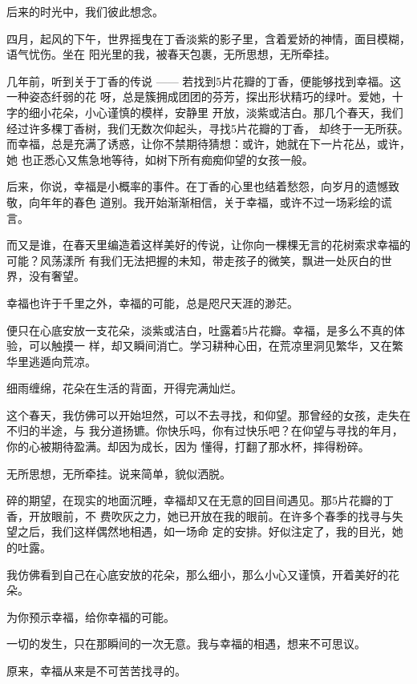 		后来的时光中，我们彼此想念。

	\endwriting



		四月，起风的下午，世界摇曳在丁香淡紫的影子里，含着爱娇的神情，面目模糊，语气忧伤。坐在
	阳光里的我，被春天包裹，无所思想，无所牵挂。

		几年前，听到关于丁香的传说 —— 若找到5片花瓣的丁香，便能够找到幸福。这一种姿态纤弱的花
	呀，总是簇拥成团团的芬芳，探出形状精巧的绿叶。爱她，十字的细小花朵，小心谨慎的模样，安静里
	开放，淡紫或洁白。那几个春天，我们经过许多棵丁香树，我们无数次仰起头，寻找5片花瓣的丁香，
	却终于一无所获。而幸福，总是充满了诱惑，让你不禁期待猜想：或许，她就在下一片花丛，或许，她
	也正悉心又焦急地等待，如树下所有痴痴仰望的女孩一般。

		后来，你说，幸福是小概率的事件。在丁香的心里也结着愁怨，向岁月的遗憾致敬，向年年的春色
	道别。我开始渐渐相信，关于幸福，或许不过一场彩绘的谎言。

		而又是谁，在春天里编造着这样美好的传说，让你向一棵棵无言的花树索求幸福的可能？风荡漾所
	有我们无法把握的未知，带走孩子的微笑，飘进一处灰白的世界，没有奢望。

		幸福也许于千里之外，幸福的可能，总是咫尺天涯的渺茫。

		便只在心底安放一支花朵，淡紫或洁白，吐露着5片花瓣。幸福，是多么不真的体验，可以触摸一
	样，却又瞬间消亡。学习耕种心田，在荒凉里洞见繁华，又在繁华里逃遁向荒凉。

		细雨缠绵，花朵在生活的背面，开得完满灿烂。


		这个春天，我仿佛可以开始坦然，可以不去寻找，和仰望。那曾经的女孩，走失在不归的半途，与
	我分道扬镳。你快乐吗，你有过快乐吧？在仰望与寻找的年月，你的心被期待盈满。却因为成长，因为
	懂得，打翻了那水杯，摔得粉碎。


		无所思想，无所牵挂。说来简单，貌似洒脱。


		碎的期望，在现实的地面沉睡，幸福却又在无意的回目间遇见。那5片花瓣的丁香，开放眼前，不
	费吹灰之力，她已开放在我的眼前。在许多个春季的找寻与失望之后，我们这样偶然地相遇，如一场命
	定的安排。好似注定了，我的目光，她的吐露。

		我仿佛看到自己在心底安放的花朵，那么细小，那么小心又谨慎，开着美好的花朵。

		为你预示幸福，给你幸福的可能。


		一切的发生，只在那瞬间的一次无意。我与幸福的相遇，想来不可思议。

		原来，幸福从来是不可苦苦找寻的。


